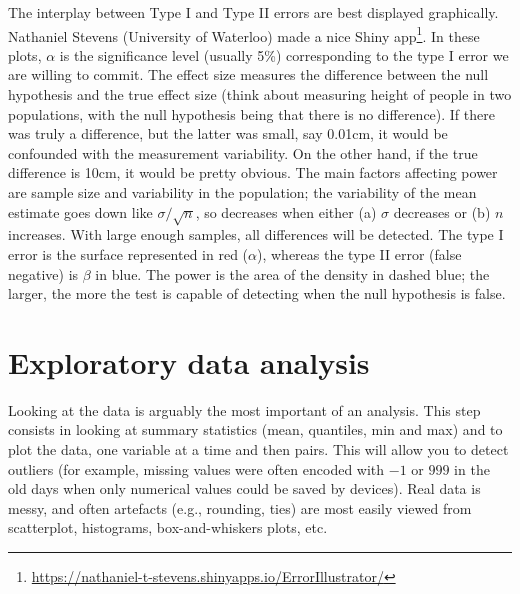 \documentclass[
]{book}
\renewcommand{\href}[2]{#2\footnote{\url{#1}}}
\begin{document}
The interplay between Type I and Type II errors are best displayed graphically. Nathaniel Stevens (University of Waterloo) made a nice \href{https://nathaniel-t-stevens.shinyapps.io/ErrorIllustrator/}{Shiny app}.
In these plots, \(\alpha\) is the significance level (usually 5\%) corresponding to the type I error we are willing to commit. The effect size measures the difference between the null hypothesis and the true effect size (think about measuring height of people in two populations, with the null hypothesis being that there is no difference). If there was truly a difference, but the latter was small, say 0.01cm, it would be confounded with the measurement variability. On the other hand, if the true difference is 10cm, it would be pretty obvious.
The main factors affecting power are sample size and variability in the population; the variability of the mean estimate goes down like \(\sigma/\sqrt{n}\), so decreases when either (a) \(\sigma\) decreases or (b) \(n\) increases. With large enough samples, all differences will be detected. The type I error is the surface represented in red (\(\alpha\)), whereas the type II error (false negative) is \(\beta\) in blue. The power is the area of the density in dashed blue; the larger, the more the test is capable of detecting when the null hypothesis is false.

\hypertarget{exploratory-data-analysis}{%
\section{Exploratory data analysis}\label{exploratory-data-analysis}}

Looking at the data is arguably the most important of an analysis. This step consists in looking at summary statistics (mean, quantiles, min and max) and to plot the data, one variable at a time and then pairs. This will allow you to detect outliers (for example, missing values were often encoded with \(-1\) or \(999\) in the old days when only numerical values could be saved by devices). Real data is messy, and often artefacts (e.g., rounding, ties) are most easily viewed from scatterplot, histograms, box-and-whiskers plots, etc.
\end{document}
